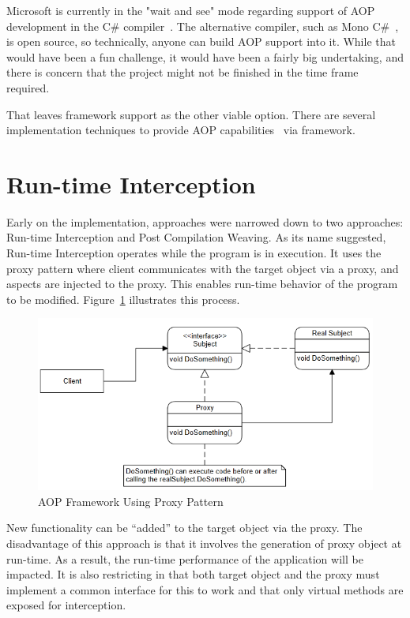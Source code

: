 Microsoft is currently in the "wait and see" mode regarding support of AOP development in the C\# compiler~\cite{hejlsberg}. The alternative compiler, such as Mono C\#~\cite{monocsharp}, is open source, so technically, anyone can build AOP support into it. While that would have been a fun challenge, it would have been a fairly big undertaking, and there is concern that the project might not be finished in the time frame required.

That leaves framework support as the other viable option. There are several implementation techniques to provide AOP capabilities~\cite{aopcs, postsharp, aspectcs} via framework.

\section{Run-time Interception}

Early on the implementation, approaches were narrowed down to two approaches: Run-time Interception and Post Compilation Weaving. As its name suggested, Run-time Interception operates while the program is in execution. It uses the proxy pattern where client communicates with the target object via a proxy, and aspects are injected to the proxy. This enables run-time behavior of the program to be modified. Figure~\ref{proxy_model} illustrates this process.

\begin{figure}[H]
  \includegraphics[scale=1.0]{Proxy3.PNG}
  \centering
  \caption{AOP Framework Using Proxy Pattern\label{proxy_model}}
\end{figure}

New functionality can be “added” to the target object via the proxy. The disadvantage of this approach is that it involves the generation of proxy object at run-time. As a result, the run-time performance of the application will be impacted. It is also restricting in that both target object and the proxy must implement a common interface for this to work and that only virtual methods are exposed for interception.

